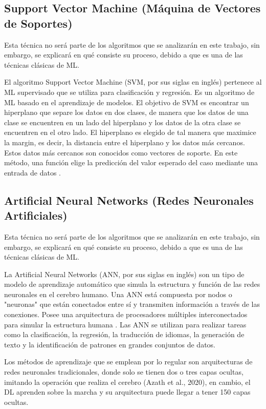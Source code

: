 \subsection{Support Vector Machine (Máquina de Vectores de Soportes)}
Esta técnica no será parte de los algoritmos que se analizarán en este trabajo, sin embargo, se explicará en qué consiste su proceso, debido a que es una de las técnicas clásicas de ML.\\
\par El algoritmo Support Vector Machine (SVM, por sus siglas en inglés) pertenece al ML supervisado que se utiliza para clasificación y regresión. Es un algoritmo de ML basado en el aprendizaje de modelos. El objetivo de SVM es encontrar un hiperplano que separe los datos en dos clases, de manera que los datos de una clase se encuentren en un lado del hiperplano y los datos de la otra clase se encuentren en el otro lado. El hiperplano es elegido de tal manera que maximice la margin, es decir, la distancia entre el hiperplano y los datos más cercanos. Estos datos más cercanos son conocidos como vectores de soporte. En este método, una función elige la predicción del valor esperado del caso mediante una entrada de datos \cite{Dantas2021}.\\


\doublespacing
\subsection{Artificial Neural Networks (Redes Neuronales Artificiales)}
Esta técnica no será parte de los algoritmos que se analizarán en este trabajo, sin embargo, se explicará en qué consiste su proceso, debido a que es una de las técnicas clásicas de ML.\\
\par La Artificial Neural Networks (ANN, por sus siglas en inglés) son un tipo de modelo de aprendizaje automático que simula la estructura y función de las redes neuronales en el cerebro humano. Una ANN está compuesta por nodos o "neuronas" que están conectados entre sí y transmiten información a través de las conexiones. Posee una arquitectura de procesadores múltiples interconectados para simular la estructura humana \cite{salas2004redes}. Las ANN se utilizan para realizar tareas como la clasificación, la regresión, la traducción de idiomas, la generación de texto y la identificación de patrones en grandes conjuntos de datos.\\
\par Los métodos de aprendizaje que se emplean por lo regular son arquitecturas de redes neuronales tradicionales, donde solo se tienen dos o tres capas ocultas, imitando la operación que realiza el cerebro (Azath et al., 2020), en cambio, el DL aprenden sobre la marcha y su arquitectura puede llegar a tener 150 capas ocultas. \\

